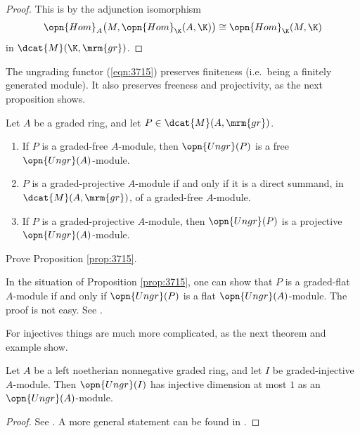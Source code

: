 \begin{proof}
This is by the adjunction isomorphism 
\[ \opn{Hom}_{A} \bigl( M, \opn{Hom}_{\K}(A, \K) \bigr) \cong
\opn{Hom}_{\K}(M, \K) \]
in $\dcat{M}(\K, \mrm{gr})$.
\end{proof}

The ungrading functor (\ref{eqn:3715}) preserves finiteness (i.e.\ 
being a finitely generated module). It also preserves freeness and 
projectivity, as the next proposition shows. 

\begin{prop} \label{prop:3715} 
Let $A$ be a graded ring, and let $P \in \dcat{M}(A, \mrm{gr})$. 
\begin{enumerate}
\item If $P$  is a graded-free $A$-module, then $\opn{Ungr}(P)$ is a 
free $\opn{Ungr}(A)$-module.

\item $P$ is a graded-projective $A$-module if and only if it is a direct 
summand, in $\dcat{M}(A, \mrm{gr})$, of a graded-free $A$-module.

\item If $P$ is a graded-projective $A$-module, then $\opn{Ungr}(P)$ is a 
projective $\opn{Ungr}(A)$-module.
\end{enumerate} 
\end{prop}

\begin{exer} \label{exer:3715} 
Prove Proposition \ref{prop:3715}.
\end{exer}

\begin{rem} \label{rem:4805}
In the situation of Proposition \ref{prop:3715}, one can show that $P$ is a 
graded-flat $A$-module if and only if  $\opn{Ungr}(P)$ is a flat 
$\opn{Ungr}(A)$-module. The proof is not easy. See 
\cite[Proposition 3.4.5]{NV}.
\end{rem}

For injectives things are much more complicated, as the next theorem and 
example show.

\begin{thm} \label{thm:3715} 
Let $A$ be a left noetherian nonnegative graded ring, and let 
$I$ be graded-injective $A$-module. Then $\opn{Ungr}(I)$ has injective 
dimension at most $1$ as an $\opn{Ungr}(A)$-module.
\end{thm}

\begin{proof}
See \cite{Ye17}. A more general statement can be found in \cite{SoZa}.
\end{proof}

